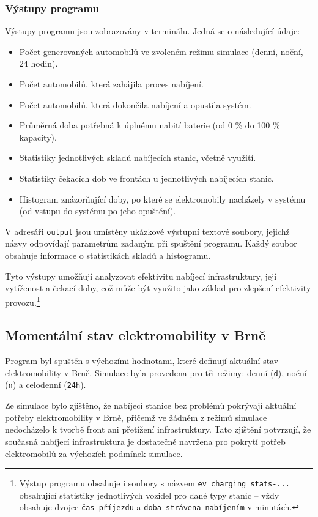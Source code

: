 \documentclass[a4paper,11pt]{article}
\begin{document}
\subsubsection{Výstupy programu}

Výstupy programu jsou zobrazovány v terminálu. Jedná se o následující údaje:
\begin{itemize}
    \item Počet generovaných automobilů ve zvoleném režimu simulace (denní, noční, 24 hodin).
    \item Počet automobilů, která zahájila proces nabíjení.
    \item Počet automobilů, která dokončila nabíjení a opustila systém.
    \item Průměrná doba potřebná k úplnému nabití baterie (od 0 \% do 100 \% kapacity).
    \item Statistiky jednotlivých skladů nabíjecích stanic, včetně využití.
    \item Statistiky čekacích dob ve frontách u jednotlivých nabíjecích stanic.
    \item Histogram znázorňující doby, po které se elektromobily nacházely v systému (od vstupu do systému po jeho opuštění).
\end{itemize}

V adresáři \texttt{output} jsou umístěny ukázkové výstupní textové soubory, jejichž názvy odpovídají parametrům zadaným při spuštění programu. Každý soubor obsahuje informace o statistikách skladů a histogramu.

Tyto výstupy umožňují analyzovat efektivitu nabíjecí infrastruktury, její vytíženost a čekací doby, což může být využito jako základ pro zlepšení efektivity provozu.\footnote{Výstup programu obsahuje i soubory s názvem \texttt{ev\_charging\_stats-...} obsahující statistiky jednotlivých vozidel pro dané typy stanic -- vždy obsahuje dvojce \texttt{čas příjezdu} a \texttt{doba strávena nabíjením} v minutách.}

\subsection{Momentální stav elektromobility v Brně} \label{actual-state}
Program byl spuštěn s výchozími hodnotami, které definují aktuální stav elektromobility v Brně. Simulace byla provedena pro tři režimy: denní (\texttt{d}), noční (\texttt{n}) a celodenní (\texttt{24h}). 

Ze simulace bylo zjištěno, že nabíjecí stanice bez problémů pokrývají aktuální potřeby elektromobility v Brně, přičemž ve žádném z režimů simulace nedocházelo k tvorbě front ani přetížení infrastruktury. Tato zjištění potvrzují, že současná nabíjecí infrastruktura je dostatečně navržena pro pokrytí potřeb elektromobilů za výchozích podmínek simulace.
\end{document}
